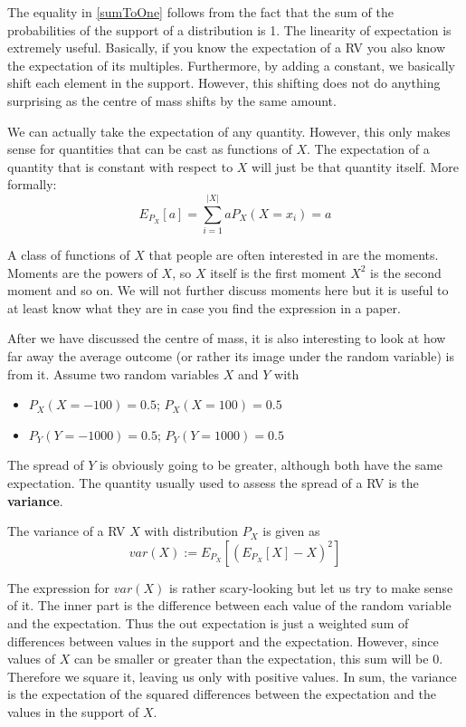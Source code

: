 \documentclass[a4paper,11pt,leqno]{report}
\begin{document}
\begin{Definition}
The equality in \ref{sumToOne} follows from the fact that the sum of the probabilities of the support of a distribution is 1.
The linearity of expectation is extremely useful. Basically, if you know the expectation of a RV you also know the 
expectation of its multiples. Furthermore, by adding a constant, we basically shift each element in the support. However, this shifting
does not do anything surprising as the centre of mass shifts by the same amount.

We can actually take the expectation of any quantity. However, this only makes sense for quantities that
can be cast as functions of $ X $. The expectation of a quantity that is constant with respect to $ X $ will just be that
quantity itself. More formally:
\begin{equation}
E_{P_{X}}[a] = \underset{i = 1}{\overset{|X|}{\sum}} aP_{X}(X=x_{i}) = a
\end{equation}

A class of functions of $ X $ that people are often interested in are the moments. Moments are the powers of $ X $, so $ X $ itself
is the first moment $ X^{2} $ is the second moment and so on. We will not further discuss moments here but it is useful to at
least know what they are in case you find the expression in a paper.

After we have discussed the centre of mass, it is also interesting to look at how far away the average outcome (or rather its image
under the random variable) is from it. Assume two random variables $ X $ and $ Y $ with
\begin{itemize}
\item $ P_{X}(X=-100) = 0.5 $; $ P_{X}(X=100) = 0.5 $
\item $ P_{Y}(Y=-1000) = 0.5 $; $ P_{Y}(Y=1000) = 0.5 $
\end{itemize}
The spread of $ Y $ is obviously going to be greater, although both have the same expectation. The quantity usually used to assess
the spread of a RV is the \textbf{variance}.

\begin{Definition}
The variance of a RV $ X $ with distribution $ P_{X} $ is given as
$$ var(X) := E_{P_{X}}[(E_{P_{X}}[X] - X)^{2}] $$
\end{Definition}

The expression for $ var(X) $ is rather scary-looking but let us try to make sense of it. The inner part is the difference between
each value of the random variable and the expectation. Thus the out expectation is just a weighted sum of differences between 
values in the support and the expectation. However, since values of $ X $ can be smaller or greater than the expectation, this
sum will be 0. Therefore we square it, leaving us only with positive values. In sum, the variance is the expectation
of the squared differences between the expectation and the values in the support of $ X $.


\end{Definition}
\end{document}
